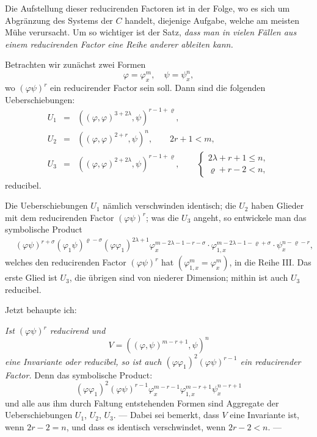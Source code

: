 \documentclass[10pt]{article}
\begin{document}
Die Aufstellung dieser reducirenden Factoren ist in der Folge, wo es sich um Abgränzung des Systems der $C$ handelt, diejenige Aufgabe, welche am meisten Mühe verursacht. Um so wichtiger ist der Satz, \emph{dass man in vielen Fällen aus einem reducirenden Factor eine Reihe anderer ableiten kann.}

Betrachten wir zunächst zwei Formen
\[
\varphi=\varphi_x^m,\quad \psi=\psi_x^n,
\]
wo $(\varphi\psi)^r$ ein reducirender Factor sein soll. Dann sind die folgenden Ueberschiebungen:
\[
\begin{array}{rcl}
U_1&=&((\varphi,\varphi)^{3+2\lambda},\psi)^{r-1+\varrho},\\[0.25em]
U_2&=&((\varphi,\varphi)^{2+r},\psi)^n,\qquad 2r+1<m,\\[0.25em]
U_3&=&((\varphi,\varphi)^{2+2\lambda},\psi)^{r-1+\varrho},\qquad
\left\{\begin{array}{l}2\lambda+r+1\leq n,\\ \varrho+r-2<n,
\end{array}\right.
\end{array}
\]
reducibel.

Die Ueberschiebungen $U_1$ nämlich verschwinden identisch; die $U_2$ haben Glieder mit dem reducirenden Factor $(\varphi\psi)^r$; was die $U_3$ angeht, so entwickele man das symbolische Product
\[
\begin{aligned}
&(\varphi\psi)^{r+\sigma}(\varphi_1\psi)^{\varrho-\sigma}(\varphi\varphi_1)^{2\lambda+1}\varphi_x^{m-2\lambda-1-r-\sigma}\cdot\varphi_{1,x}^{m-2\lambda-1-\varrho+\sigma}\cdot\psi_x^{n-\varrho-r},
\end{aligned}
\]
welches den reducirenden Factor $(\varphi\psi)^r$ hat $(\varphi_{1,x}^m=\varphi_x^m)$, in die Reihe III. Das erste Glied ist $U_3$, die übrigen sind von niederer Dimension; mithin ist auch $U_3$ reducibel.

Jetzt behaupte ich:

\emph{Ist $(\varphi\psi)^r$ reducirend und}
\[
V=((\varphi,\psi)^{m-r+1},\psi)^n
\]
\emph{eine Invariante oder reducibel, so ist auch $(\varphi\varphi_1)^2(\varphi\psi)^{r-1}$ ein reducirender Factor.} Denn das symbolische Product:
\[
(\varphi\varphi_1)^2(\varphi\psi)^{r-1}\varphi_x^{m-r-1}\varphi_{1,x}^{m-r+1}\psi_x^{n-r+1}
\]
und alle aus ihm durch Faltung entstehenden Formen sind Aggregate der Ueberschiebungen $U_1$, $U_2$, $U_3$. --- Dabei sei bemerkt, dass $V$ eine Invariante ist, wenn $2r-2=n$, und dass es identisch verschwindet, wenn $2r-2<n$. ---
\end{document}
